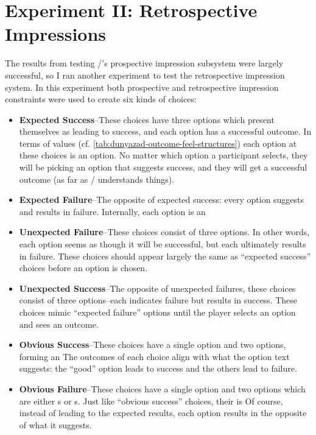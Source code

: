 \section{Experiment II: Retrospective Impressions}

\label{sec:exp-retrospective}

The results from testing \dunyazad/'s prospective impression subsystem were largely successful, so I ran another experiment to test the retrospective impression system.
%
In this experiment both prospective and retrospective impression constraints were used to create six kinds of choices:

\begin{itemize}
  \item \textbf{Expected Success}--These choices have three options which present themselves as leading to success, and each option has a successful outcome. In terms of  values (cf. \cref{tab:dunyazad-outcome-feel-structures}) each option at these choices is an  option. No matter which option a participant selects, they will be picking an option that suggests success, and they will get a successful outcome (as far as \dunyazad/ understands things).
  \item \textbf{Expected Failure}--The opposite of expected success: every option suggests and results in failure. Internally, each option is an 
  \item \textbf{Unexpected Failure}--These choices consist of three  options. In other words, each option seems as though it will be successful, but each ultimately results in failure. These choices should appear largely the same as ``expected success'' choices before an option is chosen.
  \item \textbf{Unexpected Success}--The opposite of unexpected failures, these choices consist of three  options--each indicates failure but results in success. These choices mimic ``expected failure'' options until the player selects an option and sees an outcome.
  \item \textbf{Obvious Success}--These choices have a single  option and two  options, forming an   The outcomes of each choice align with what the option text suggests: the ``good'' option leads to success and the others lead to failure.
  \item \textbf{Obvious Failure}--These choices have a single  option and two options which are either s or s. Just like ``obvious success'' choices, their  is  Of course, instead of leading to the expected results, each option results in the opposite of what it suggests.
\end{itemize}

